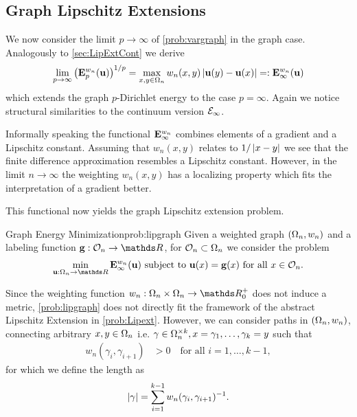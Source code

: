\subsection{Graph Lipschitz Extensions}\label{sec:GLipExt}
%
We now consider the limit $p\to\infty$ of \cref{prob:vargraph} in the graph case. Analogously to \cref{sec:LipExtCont} we derive
%
\begin{align*}
\lim_{p\to\infty} \left(\mathbf{E}^{w_n}_p(\mathbf{u})\right)^{1/p}= \max_{x,y\in\Omega_n} w_n(x,y) \left|\mathbf{u}(y) - \mathbf{u}(x)\right|=:\mathbf{E}^{w_n}_\infty(\mathbf{u})
\end{align*}
%
which extends the graph $p$-Dirichlet energy to the case $p=\infty$. Again we notice structural similarities to 
the continuum version $\mathcal{E}_\infty$. 
%
\begin{remark}{}{}
Informally speaking the functional $\mathbf{E}^{w_n}_\infty$ combines elements of a gradient and a Lipschitz constant. Assuming that $w_n(x,y)$ relates to $1/\left|x-y\right|$ we see that the finite difference approximation
resembles a Lipschitz constant. However, in the limit $n\to\infty$ the weighting $w_n(x,y)$ has a localizing property which fits the interpretation of a gradient better.
\end{remark}
%
\noindent%
This functional now yields the graph Lipschitz extension problem.
%
\begin{problem}{Graph Energy Minimization}{prob:lipgraph}
Given a weighted graph $(\Omega_n, w_n)$ and a labeling function $\vec g:\conset_n\to\R$, for $\mathcal{O}_n\subset\Omega_n$ we consider 
the problem
%
\begin{align*}
\min_{\vec u:\domain_n\to\R} \GE_\infty^{w_n}(\vec u) \text{ subject to } \vec u(x) = \vec g(x) \text{ for all } x\in\conset_n.
\end{align*}
\end{problem}
%
\noindent%
Since the weighting function $w_n:\domain_n\times\domain_n\to\R^+_0$ does not induce a metric, \cref{prob:lipgraph} does not directly fit the framework of the abstract Lipschitz Extension in \cref{prob:Lipext}. However, we can consider paths in $(\Omega_n, w_n)$, connecting arbitrary $x,y\in\Omega_n$ i.e. $\gamma\in\Omega_n^{\times k}, x=\gamma_1,\ldots, \gamma_k = y$ such that 
%
\begin{align*}
w_n(\gamma_i, \gamma_{i+1}) &> 0\quad\text{for all } i=1,\ldots, k-1,
\end{align*}
%
for which we define the length as
%
\begin{align*}
\left|\gamma\right| = \sum_{i=1}^{k-1} w_n(\gamma_i, \gamma_{i+1})^{-1}.
\end{align*}
